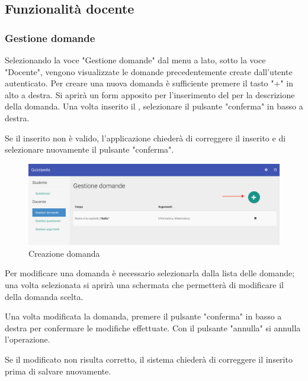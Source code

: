 \documentclass[12pt,a4paper]{article}
\begin{document}
	\subsection{Funzionalità docente}
	
    \subsubsection{Gestione domande}

    Selezionando la voce "Gestione domande" dal menu a lato, sotto la voce "Docente", vengono visualizzate le domande precedentemente create dall'utente autenticato. 
	Per creare una nuova domanda è sufficiente premere il tasto "+" in alto a destra. 
	Si aprirà un form apposito per l'inserimento del  per la descrizione della domanda.
	Una volta inserito il , selezionare il pulsante "conferma" in basso a destra.
	
	Se il  inserito non è valido, l'applicazione chiederà di correggere il  inserito e di selezionare nuovamente il pulsante "conferma".
	
		\begin{figure}[H]	
			\centering
			\includegraphics[width=1\linewidth]{../img/screenshot/creazioneDomanda.png}
			\caption{Creazione domanda}
			\label{Creazione domanda}
		\end{figure}
	
	\par Per modificare una domanda è necessario selezionarla dalla lista delle domande; una volta selezionata si aprirà una schermata che permetterà di modificare il  della domanda scelta. \\
	\par Una volta modificata la domanda, premere il pulsante "conferma" in basso a destra per confermare le modifiche effettuate. Con il pulsante "annulla" si annulla l'operazione. \\
	\par Se il  modificato non risulta corretto, il sistema chiederà di correggere il  inserito prima di salvare nuovamente. \\
	
\end{document}
